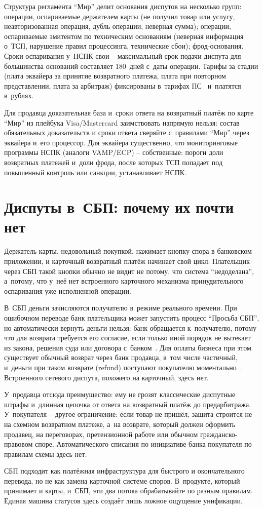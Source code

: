 Структура регламента \enquote{Мир} делит основания диспутов
на несколько групп: операции, оспариваемые держателем карты
(не получил товар или услугу, неавторизованная операция, дубль
операции, неверная сумма); операции, оспариваемые эмитентом
по техническим основаниям (неверная информация о~ТСП, нарушение
правил процессинга, технические сбои); фрод-основания. Сроки
оспаривания у~НСПК свои -- максимальный срок подачи диспута
для большинства оснований составляет 180~дней с~даты операции. Тарифы за стадии (плата
эквайера за принятие возвратного платежа, плата при повторном представлении,
плата за арбитраж) фиксированы в~тарифах ПС~\cite{nspk-mir-tariffs}
и~платятся в~рублях.

Для продавца доказательная база и~сроки
ответа на возвратный платёж по карте \enquote{Мир} из плейбука Visa/Mastercard
заимствовать напрямую нельзя: состав обязательных доказательств и
сроки ответа сверяйте с~правилами \enquote{Мир} через эквайера и~его
процессор. Для эквайера существенно, что мониторинговые программы НСПК
(аналоги VAMP/ECP) -- собственные: пороги доли возвратных платежей и~доли фрода,
после которых ТСП попадает под повышенный контроль или
санкции, устанавливает НСПК.

\section{Диспуты в~СБП: почему их почти нет}\label{sec:disputes-sbp}

Держатель карты, недовольный покупкой, нажимает кнопку спора в
банковском приложении, и карточный возвратный платёж начинает свой цикл.
Плательщик через СБП такой кнопки обычно не видит не потому,
что система \enquote{недоделана}, а~потому, что у~неё нет встроенного
карточного механизма принудительного оспаривания уже исполненной
операции.

В~СБП деньги зачисляются получателю в~режиме реального времени. При
ошибочном переводе банк плательщика может запустить процесс
\enquote{Просьба СБП}, но автоматически вернуть деньги нельзя: банк
обращается к~получателю, потому что для возврата требуется его
согласие, если только иной порядок не вытекает из закона, решения суда
или договора с~банком~\cite{cbr-sbp-faq-mistaken-transfer}.
Для оплаты бизнеса при этом существует обычный возврат через банк
продавца, в~том числе частичный, и~деньги при таком возврате
(refund) поступают покупателю моментально~\cite{sbp-faq-business}.
Встроенного сетевого диспута, похожего на карточный, здесь нет.

У~продавца отсюда преимущество: ему не грозят классические диспутные
штрафы и~длинная цепочка от ответа на возвратный платёж до предарбитража.
У~покупателя -- другое ограничение: если товар не пришёл,
защита строится не на схемном возвратном платеже, а~на возврате, который должен
оформить продавец, на переговорах, претензионной работе или обычном
гражданско-правовом споре. Автоматического списания по инициативе банка
покупателя по правилам схемы здесь нет.

СБП подходит как платёжная инфраструктура для быстрого и окончательного перевода,
но не как замена карточной системе споров. В~продукте, который принимает
и карты, и~СБП, эти два потока обрабатывайте по разным правилам.
Единая машина статусов здесь создаёт лишь ложное ощущение унификации.
